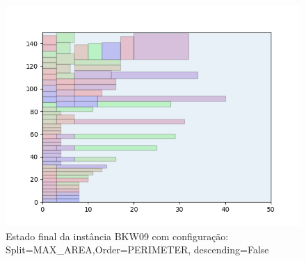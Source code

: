 \begin{figure}[H]
    \centering
    \caption[]{Estado final da instância BKW09 com configuração: Split=MAX_AREA,Order=PERIMETER, descending=False}
    \label{fig:bkw09-max_area-perimeter-false}
    \includegraphics[scale=0.5]{output/figures/bkw/bkw09/max_area/perimeter/false/000}
\end{figure}